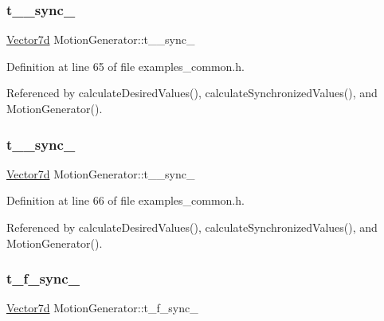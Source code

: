 \subsubsection{\texorpdfstring{t\+\_\+\_\+sync\+\_\+}{t\_1\_sync\_}}
{\footnotesize\ttfamily \hyperlink{classMotionGenerator_a499bd17d3a5c7583b4c06923f532185d}{Vector7d} Motion\+Generator\+::t\+\_\+\_\+sync\+\_\+\hspace{0.3cm}{\ttfamily [private]}}



Definition at line 65 of file examples\+\_\+common.\+h.



Referenced by calculate\+Desired\+Values(), calculate\+Synchronized\+Values(), and Motion\+Generator().

\mbox{\label{classMotionGenerator_a5b25974dfd22aefacc286a01211ff93d}} 
\subsubsection{\texorpdfstring{t\+\_\+\_\+sync\+\_\+}{t\_2\_sync\_}}
{\footnotesize\ttfamily \hyperlink{classMotionGenerator_a499bd17d3a5c7583b4c06923f532185d}{Vector7d} Motion\+Generator\+::t\+\_\+\_\+sync\+\_\+\hspace{0.3cm}{\ttfamily [private]}}



Definition at line 66 of file examples\+\_\+common.\+h.



Referenced by calculate\+Desired\+Values(), calculate\+Synchronized\+Values(), and Motion\+Generator().

\mbox{\label{classMotionGenerator_a7119bd48c0d8b0f838a3a81e8f52a8b2}} 
\subsubsection{\texorpdfstring{t\+\_\+f\+\_\+sync\+\_\+}{t\_f\_sync\_}}
{\footnotesize\ttfamily \hyperlink{classMotionGenerator_a499bd17d3a5c7583b4c06923f532185d}{Vector7d} Motion\+Generator\+::t\+\_\+f\+\_\+sync\+\_\+\hspace{0.3cm}{\ttfamily [private]}}



